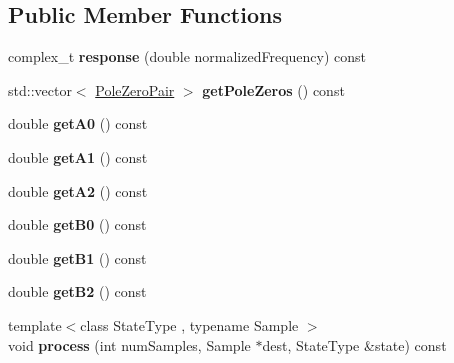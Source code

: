 \subsection*{Public Member Functions}
\begin{DoxyCompactItemize}
\item 
\hypertarget{classDsp_1_1BiquadBase_abc176e6a59f3badc0952149bfcf38cf0}{complex\-\_\-t {\bfseries response} (double normalized\-Frequency) const }\label{classDsp_1_1BiquadBase_abc176e6a59f3badc0952149bfcf38cf0}

\item 
\hypertarget{classDsp_1_1BiquadBase_a9c800686c08333e3d73d5907a7375a41}{std\-::vector$<$ \hyperlink{structDsp_1_1PoleZeroPair}{Pole\-Zero\-Pair} $>$ {\bfseries get\-Pole\-Zeros} () const }\label{classDsp_1_1BiquadBase_a9c800686c08333e3d73d5907a7375a41}

\item 
\hypertarget{classDsp_1_1BiquadBase_afe119d27f1d063faa7f2d312b0898da4}{double {\bfseries get\-A0} () const }\label{classDsp_1_1BiquadBase_afe119d27f1d063faa7f2d312b0898da4}

\item 
\hypertarget{classDsp_1_1BiquadBase_a2d39da6584630802edda35747dc408d2}{double {\bfseries get\-A1} () const }\label{classDsp_1_1BiquadBase_a2d39da6584630802edda35747dc408d2}

\item 
\hypertarget{classDsp_1_1BiquadBase_abfc05e4fc56d5c994103267885e981ff}{double {\bfseries get\-A2} () const }\label{classDsp_1_1BiquadBase_abfc05e4fc56d5c994103267885e981ff}

\item 
\hypertarget{classDsp_1_1BiquadBase_ac4da98e79d2fbabce98127b046d3b3c8}{double {\bfseries get\-B0} () const }\label{classDsp_1_1BiquadBase_ac4da98e79d2fbabce98127b046d3b3c8}

\item 
\hypertarget{classDsp_1_1BiquadBase_a72160084051442726ad8d78f3386680d}{double {\bfseries get\-B1} () const }\label{classDsp_1_1BiquadBase_a72160084051442726ad8d78f3386680d}

\item 
\hypertarget{classDsp_1_1BiquadBase_a1401510d837b59dd9cd6ff98d4ba51e5}{double {\bfseries get\-B2} () const }\label{classDsp_1_1BiquadBase_a1401510d837b59dd9cd6ff98d4ba51e5}

\item 
\hypertarget{classDsp_1_1BiquadBase_a0f0e8556d3aeb492ae36f7df89acbfaf}{{\footnotesize template$<$class State\-Type , typename Sample $>$ }\\void {\bfseries process} (int num\-Samples, Sample $\ast$dest, State\-Type \&state) const }\label{classDsp_1_1BiquadBase_a0f0e8556d3aeb492ae36f7df89acbfaf}

\end{DoxyCompactItemize}
